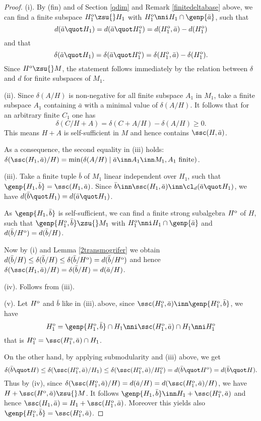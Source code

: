 \begin{proof}
(i). By (fin) and  of Section \ref{qdim} and Remark \ref{finitedeltabase} above, we can find a finite subspace $H^{\rm o}_{1}\zsu{}H_{1}$
with $H^{\rm o}_{1}\nni H_{1}\cap\genp{\bar a}$, such that
$$d(\bar a\quot H_{1})=d(\bar a\quot H_{1}^{\rm o})=d(H^{\rm o}_{1},\bar a)-d(H^{\rm o}_{1})$$
and that
$$\delta(\bar a\quot H_{1})=\delta(\bar a\quot H_{1}^{\rm o})=\delta(H^{\rm o}_{1},\bar a)-\delta(H^{\rm o}_{1}).$$
Since $H^{\rm o}\zsu{}M$, the statement follows immediately by the relation between $\delta$ and $d$ for
finite subspaces of $M_{1}$.

\smallskip
(ii). Since $\delta(A/H)$ is non-negative for all finite subspace $A_{1}$ in $M_{1}$, take
a finite subspace $A_{1}$ containing $\bar a$ with a minimal value of $\delta(A/H)$.
It follows that for an arbitrary finite $C_{1}$ one has
$$\delta(C/H+A)=\delta(C+A/H)-\delta(A/H)\geq0.$$
This means $H+A$ is self-sufficient in $M$ and hence contains $\ssc(H,\bar a)$.

As a consequence,
the second equality in (iii) holds: $\delta(\ssc(H_{1},\bar a)/H)=\min(\delta(A/H)\mid\bar a\inn A_{1}\inn M_{1},A_{1}\text{ finite})$.

\smallskip
(iii). Take a finite tuple $\bar b$ of $M_{1}$ linear independent over $H_{1}$,
such that $\genp{H_{1},\bar b}=\ssc(H_{1},\bar a)$.
Since $\bar b\inn\ssc(H_{1},\bar a)\inn\cl_{d}(\bar a\quot H_{1})$,
we have $d(\bar b\quot H_{1})=d(\bar a\quot H_{1})$.

As $\genp{H_{1},\bar b}$ is self-sufficient, we can find a finite strong subalgebra $H^{\rm o}$ of $H$,
such that $\genp{H_{1}^{\rm o},\bar b}\zsu{}M_{1}$ with $H_{1}^{\rm o}\nni H_{1}\cap\genp{\bar a}$ and
$d(\bar b/H^{\rm o})=d(\bar b/H)$.

Now by (i) and Lemma \ref{2transmogrifer} we obtain
$d(\bar b/H)\leq\delta(\bar b/H)\leq\delta(\bar b/H^{\rm o})=d(\bar b/H^{\rm o})$ and hence
$\delta(\ssc(H_{1},\bar a)/H)=\delta(\bar b/H)=d(\bar a/H)$. 

\smallskip
(iv). Follows from (iii). 

\smallskip
(v). Let $H^{\rm o}$ and $\bar b$ like in (iii).\,above, since $\ssc(H^{\rm o}_{1},\bar a)\inn\genp{H^{\rm o}_{1},\bar b}$,
we have
$$H^{\rm o}_{1}=\genp{H^{\rm o}_{1},\bar b}\cap H_{1}\nni\ssc(H^{\rm o}_{1},\bar a)\cap H_{1}\nni H^{\rm o}_{1}$$
that is $H^{\rm o}_{1}=\ssc(H^{\rm o}_{1},\bar a)\cap H_{1}$.

On the other hand, by applying submodularity  and (iii) above, we get
$$\delta(\bar b\quot H)\leq\delta(\ssc(H^{\rm o}_{1},\bar a)/H_{1})
\leq\delta(\ssc(H^{\rm o}_{1},\bar a)/H_{1}^{\rm o})=d(\bar b\quot H^{\rm o})=d(\bar b\quot H).$$
Thus by (iv), since  $\delta(\ssc(H^{\rm o}_{1},\bar a)/H)=d(\bar a/H)=d(\ssc(H^{\rm o}_{1},\bar a)/H)$, we have
$H+\ssc(H^{\rm o},\bar a)\zsu{}M$.
It follows $\genp{H_{1},\bar b}\inn H_{1}+\ssc(H^{\rm o}_{1},\bar a)$ and hence $\ssc(H_{1},\bar a)=H_{1}+\ssc(H_{1}^{\rm o},\bar a)$.
Moreover this yields also $\genp{H_{1}^{\rm o},\bar b}=\ssc(H^{\rm o}_{1},\bar a)$.
\end{proof}
